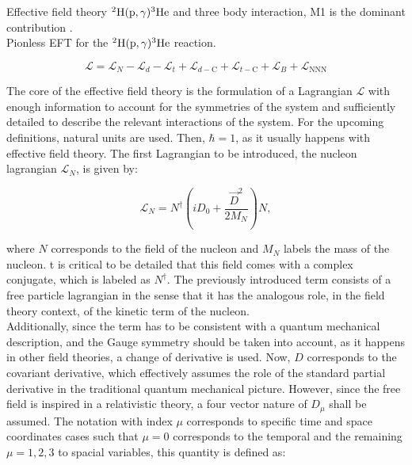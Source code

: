 \documentclass[openany]{book}
\begin{document}
Effective field theory $\mathrm{{}^{2}H(p, \gamma){}^{3}He}$ and three body interaction, M1 is the dominant contribution \cite{sadeghi_khalili_godarzi_2013}. \\

Pionless EFT for the $\mathrm{{}^{2}H(p, \gamma){}^{3}He}$ reaction. 

\begin{equation}\label{eq:micro_EFT_lagrangian_extended}
	\mathcal{L} = \mathcal{L}_N  -  \mathcal{L}_d -   \mathcal{L}_t +  \mathcal{L}_{d-\mathrm{C}}  +   \mathcal{L}_{t-\mathrm{C}} + \mathcal{L}_B + \mathcal{L}_{\mathrm{NNN}}
\end{equation}

The core of the effective field theory is the formulation of a Lagrangian $\mathcal{L}$ with enough information to account for the symmetries of the system and sufficiently detailed to describe the relevant interactions of the system. For the upcoming definitions, natural units are used. Then, $\hbar = 1$, as it usually happens with effective field theory. The first Lagrangian to be introduced, the nucleon lagrangian $\mathcal{L}_N$, is given by:
 
\begin{equation}\label{eq:micro_EFT_lagrangian_N}
	 \mathcal{L}_N  = N^{\dagger} \left(i D_0 + \frac{\vec D^2}{2M_N} \right) N,
\end{equation}

where $N$ corresponds to the field of the nucleon and $M_N$ labels the mass of the nucleon.  t is critical to be detailed that this field comes with a complex conjugate, which is labeled as $N^{\dagger}$. The previously introduced term consists of a free particle lagrangian in the sense that it has the analogous role, in the field theory context, of the kinetic term of the nucleon. \\

Additionally, since the term has to be consistent with a quantum mechanical description, and the Gauge symmetry should be taken into account, as it happens in other field theories, a change of derivative is used. Now, $D$ corresponds to the covariant derivative, which effectively assumes the role of the standard partial derivative in the traditional quantum mechanical picture. However, since the free field is inspired in a relativistic theory, a four vector nature of $D_\mu$ shall be assumed. The notation with index $\mu$ corresponds to specific time and space coordinates cases such that  $\mu = 0$  corresponds to the temporal and the remaining $\mu = 1, 2, 3$ to spacial variables,  this quantity is defined as:
\end{document}
